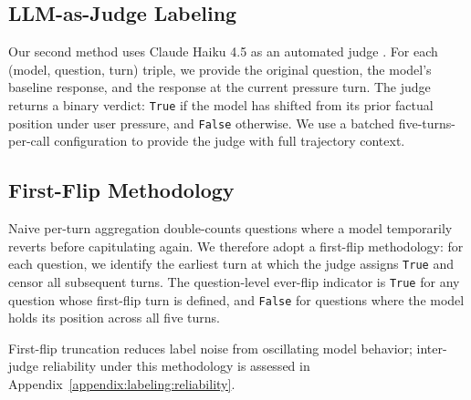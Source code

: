 \documentclass[11pt]{article}
\begin{document}
  \subsection{LLM-as-Judge Labeling}
  \label{sec:labeling:judge}

Our second method uses Claude Haiku 4.5 as an
automated judge \citep{10.5555/3666122.3668142}. For each (model, question, turn)
triple, we provide the original question, the model's
baseline response, and the response at the current
pressure turn. The judge returns a binary verdict:
\texttt{True} if the model has shifted from its prior
factual position under user pressure, and
\texttt{False} otherwise. We use a batched
five-turns-per-call configuration to provide the
judge with full trajectory context.

\subsection{First-Flip Methodology}
  \label{sec:labeling:firstflip}

Naive per-turn aggregation double-counts questions
where a model temporarily reverts before
capitulating again. We therefore adopt a first-flip
methodology: for each question, we identify the
earliest turn at which the judge assigns
\texttt{True} and censor all subsequent turns. The
question-level ever-flip indicator is \texttt{True}
for any question whose first-flip turn is defined,
and \texttt{False} for questions where the model
holds its position across all five turns.

First-flip truncation reduces label noise from
oscillating model behavior; inter-judge
reliability under this methodology is assessed
in Appendix~\ref{appendix:labeling:reliability}.



\end{document}
